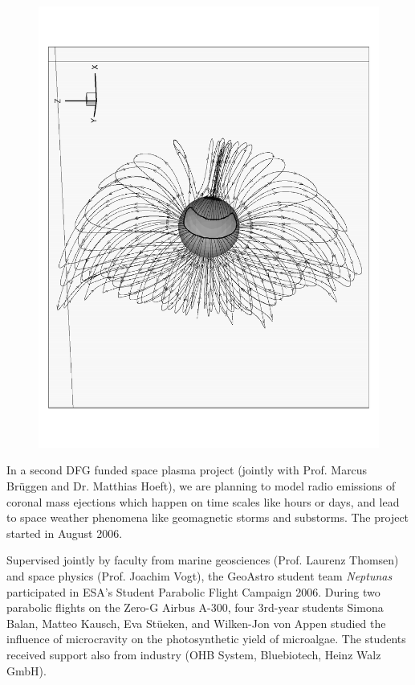 \begin{figure}[ht]
  \begin{center}
    \includegraphics[height=\hsize, angle=270]{Vogt/Vogt_2006_Fig}
    \label{fig:Vogt_2006_Fig}
  \end{center}
\end{figure}

In a second DFG funded space plasma project (jointly with Prof. Marcus
Br{\"u}ggen and Dr. Matthias Hoeft), we are planning to model radio emissions
of coronal mass ejections which happen on time scales like hours or days,
and lead to space weather phenomena like geomagnetic storms and substorms.
The project started in August 2006.

Supervised jointly by faculty from marine geosciences (Prof. Laurenz
Thomsen) and space physics (Prof. Joachim Vogt), the GeoAstro student team
\emph{Neptunas\/} participated in ESA's Student Parabolic Flight Campaign
2006.  During two parabolic flights on the Zero-G Airbus A-300,
four 3rd-year students Simona Balan, Matteo Kausch, Eva St\"ueken, and
Wilken-Jon von Appen studied the influence of microcravity on the
photosynthetic yield of microalgae.  The students received support also
from industry (OHB System, Bluebiotech, Heinz Walz GmbH).



